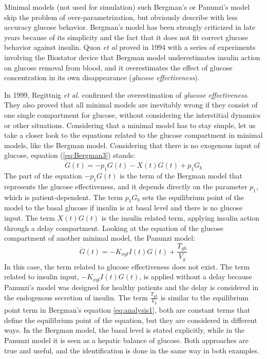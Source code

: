 Minimal models (not used for simulation) such Bergman's or Panunzi's model skip the problem of over-parametrization, but obviously describe with less accuracy glucose behavior. Bergman's model has been strongly criticized in late years because of its simplicity and the fact that it does not fit correct glucose behavior against insulin. Quon \textit{et al} \cite{quon1994non} proved in 1994 with a series of experiments involving the Biostator device that Bergman model underestimates insulin action on glucose removal from blood, and it overestimates the effect of glucose concentration in its own disappearance (\textit{glucose effectiveness}).

In 1999, Regittnig \textit{et al.} \cite{regittnig1999plasma} confirmed the overestimation of \textit{glucose effectiveness}. They also proved that all minimal models are inevitably wrong if they consist of one single compartment for glucose, without considering the interstitial dynamics or other situations. Considering that a minimal model has to stay simple, let us take a closer look to the equations related to the glucose compartment in minimal models, like the Bergman model. Considering that there is no exogenous input of glucose, equation (\eqref{eq:Bergman3}) stands:
\begin{equation}
	\dot{G}(t) = -p_{1}G(t)-X(t)G(t)+p_{1}G_{b}
\label{eq:analysis1}
\end{equation}
The part of the equation $-p_{1}G(t)$ is the term of the Bergman model that represents the glucose effectiveness, and it depends directly on the parameter $p_{1}$, which is patient-dependent. The term $p_{1}G_{b}$ sets the equilibrium point of the model to the basal glucose if insulin is at basal level and there is no glucose input. The term $X(t)G(t)$ is the insulin related term, applying insulin action through a delay compartment. Looking at the equation of the glucose compartment of another minimal model, the Panunzi model:
\begin{equation}
	\dot{G}(t) = -K_{xgl}I(t)G(t) +\frac{T_{gh}}{V_{g}}
\label{eq:analysis2}
\end{equation}
In this case, the term related to glucose effectiveness does not exist. The term related to insulin input, $-K_{xgl}I(t)G(t)$, is applied without a delay because Panunzi's model was designed for healthy patients and the delay is considered in the endogenous secretion of insulin. The term $\frac{T_{gh}}{V_{g}}$ is similar to the equilibrium point term in Bergman's equation \eqref{eq:analysis1}, both are constant terms that define the equilibrium point of the equation, but they are considered in different ways. In the Bergman model, the basal level is stated explicitly, while in the Panunzi model it is seen as a hepatic balance of glucose. Both approaches are true and useful, and the identification is done in the same way in both examples.

